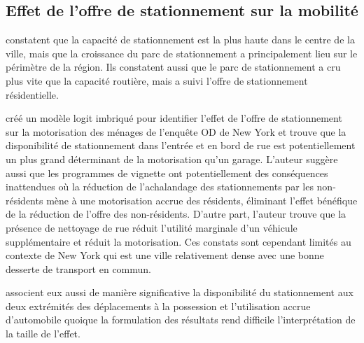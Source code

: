   \subsection{Effet de l'offre de stationnement sur la mobilité}
    \textcite{Chester:ParkingInfrastructure:2015} constatent que la capacité de stationnement est la plus haute dans le centre de la ville, mais que la croissance du parc de stationnement a principalement lieu sur le périmètre de la région.  Ils constatent aussi que le parc de stationnement a cru plus vite que la capacité routière, mais a suivi l'offre de stationnement résidentielle.\par
    \textcite{Guo:DoesResidential:2013} créé un modèle logit imbriqué pour identifier l'effet de l'offre de stationnement sur la motorisation des ménages de l'enquête OD de New York et trouve que la disponibilité de stationnement dans l'entrée et en bord de rue est potentiellement un plus grand déterminant de la motorisation qu'un garage. L'auteur suggère aussi que les programmes de vignette ont potentiellement des conséquences inattendues où la réduction de l'achalandage des stationnements par les non-résidents mène à une motorisation accrue des résidents, éliminant l'effet bénéfique de la réduction de l'offre des non-résidents. D'autre part, l'auteur trouve que la présence de nettoyage de rue réduit l'utilité marginale d'un véhicule supplémentaire et réduit la motorisation. Ces constats sont cependant limités au contexte de New York qui est une ville relativement dense avec une bonne desserte de transport en commun.\par
    \textcite{Yin:BuiltEnvironment:2018} associent eux aussi de manière significative la disponibilité du stationnement aux deux extrémités des déplacements à la possession et l'utilisation accrue d'automobile quoique la formulation des résultats rend difficile l'interprétation de la taille de l'effet.\par
